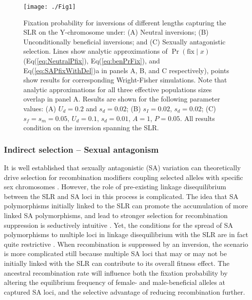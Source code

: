 \documentclass{article}[12pt]
\begin{document}
 \begin{figure}[htbp]
 \centering
 \texttt{[image: ./Fig1]}
 \caption{Fixation probability for inversions of different lengths capturing the SLR on the Y-chromosome under: (A) Neutral inversions; (B) Unconditionally beneficial inversions; and (C) Sexually antagonistic selection. Lines show analytic approximations of $\Pr(\text{fix} \mid x)$ (Eq(\ref{eq:NeutralPfix}), Eq(\ref{eq:benPrFix}), and Eq(\ref{eq:SAPfixWithDel})a in panels A, B, and C respectively), points show results for corresponding Wright-Fisher simulations. Note that analytic approximations for all three effective populations sizes overlap in panel A. Results are shown for the following parameter values: (A) $U_d = 0.2$ and $s_d = 0.02$; (B) $s_I = 0.02$, $s_d = 0.02$; (C) $s_f = s_m = 0.05$, $U_d = 0.1$, $s_d = 0.01$, $A = 1$, $P = 0.05$. All results condition on the inversion spanning the SLR.}
 \label{fig:fixProbFig}
 \end{figure}


\subsubsection*{Indirect selection -- Sexual antagonism}\label{sec:SexAntag}

It is well established that sexually antagonistic (SA) variation can theoretically drive selection for recombination modifiers coupling selected alleles with specific sex chromosomes \cite[e.g.][]{Fisher1931,Nei1969, Charlesworth1978a, Charlesworth1980, Bull1983,Lenormand2003, Otto2019}. However, the role of pre-existing linkage disequilibrium between the SLR and SA loci in this process is complicated. The idea that SA polymorphisms initially linked to the SLR can promote the accumulation of more linked SA polymorphisms, and lead to stronger selection for recombination suppression is seductively intuitive \citep{Rice1984, Rice1996, Charlesworth2017, Otto2019}. Yet, the conditions for the spread of SA polymorphisms to multiple loci in linkage disequilibrium with the SLR are in fact quite restrictive \citep{Otto2019}. When recombination is suppressed by an inversion, the scenario is more complicated still because multiple SA loci that may or may not be initially linked with the SLR can contribute to its overall fitness effect. The ancestral recombination rate will influence both the fixation probability by altering the equilibrium frequency of female- and male-beneficial alleles at captured SA loci, and the selective advantage of reducing recombination further.
\end{document}
